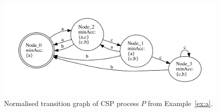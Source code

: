  \begin{figure}[t]
   \begin{center}
     \includegraphics[width=\textwidth]{q0.pdf}
   \end{center}
   \caption{Normalised transition graph of CSP process $P$ from Example~\ref{ex:a}.}
   \label{fig:tga}
 \end{figure}

